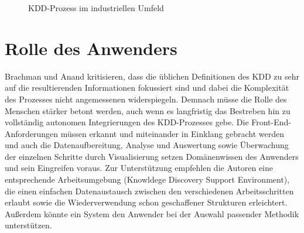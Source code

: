 \begin{figure} [H]
\begin{center}
  \caption{KDD-Prozess im industriellen Umfeld}\label{KDDAnwendung}
\end{center}
\end{figure}


\section{Rolle des Anwenders}

Brachman und Anand \cite{Brachman:1994} kritisieren, dass die üblichen Definitionen des KDD zu sehr auf die resultierenden Informationen fokussiert sind und dabei die Komplexität des Prozesses nicht angemessenen widerspiegeln. Demnach müsse die Rolle des Menschen stärker betont werden, auch wenn es langfristig das Bestreben hin zu vollständig autonomen Integrierungen des KDD-Prozesses gebe. Die Front-End-Anforderungen müssen erkannt und miteinander in Einklang gebracht werden und auch die Datenaufbereitung, Analyse und Auswertung sowie Überwachung der einzelnen Schritte durch Visualisierung setzen Domänenwissen des Anwenders und sein Eingreifen voraus. Zur Unterstützung empfehlen die Autoren eine entsprechende Arbeitsumgebung (Knowldege Discovery Support Environment), die einen einfachen Datenaustausch zwischen den verschiedenen Arbeitsschritten erlaubt sowie die Wiederverwendung schon geschaffener Strukturen erleichtert. Außerdem könnte ein System den Anwender bei der Auswahl passender Methodik unterstützen.

